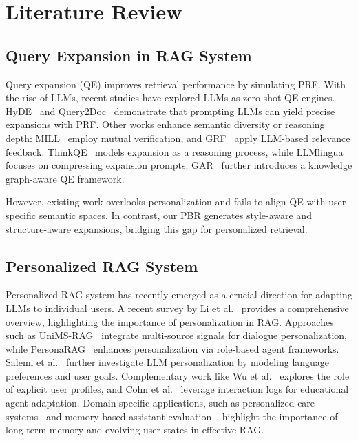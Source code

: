 \section{Literature Review}

\subsection{Query Expansion in RAG System}

Query expansion (QE) improves retrieval performance by simulating PRF. With the rise of LLMs, recent studies have explored LLMs as zero-shot QE engines. HyDE~\cite{gao2023precise} and Query2Doc~\cite{wang2023query2doc} demonstrate that prompting LLMs can yield precise expansions with PRF. Other works enhance semantic diversity or reasoning depth: MILL~\cite{jia2023mill} employ mutual verification, and GRF~\cite{mackie2023generative} apply LLM-based relevance feedback. ThinkQE~\cite{lei2025thinkqe} models expansion as a reasoning process, while LLMlingua~\cite{jiang2023llmlingua} focuses on compressing expansion prompts. GAR~\cite{xia2024knowledge} further introduces a knowledge graph-aware QE framework.

However, existing work overlooks personalization and fails to align QE with user-specific semantic spaces. In contrast, our PBR generates style-aware and structure-aware expansions, bridging this gap for personalized retrieval.

\subsection{Personalized RAG System}

Personalized RAG system has recently emerged as a crucial direction for adapting LLMs to individual users. A recent survey by Li et al.~\cite{li2025survey,li2023agent4ranking} provides a comprehensive overview, highlighting the importance of personalization in RAG. Approaches such as UniMS-RAG~\cite{wang2024unims} integrate multi-source signals for dialogue personalization, while PersonaRAG~\cite{zerhoudi2024personarag} enhances personalization via role-based agent frameworks. Salemi et al.~\cite{salemi2024lamp} further investigate LLM personalization by modeling language preferences and user goals. Complementary work like Wu et al.~\cite{wu2024understanding} explores the role of explicit user profiles, and Cohn et al.~\cite{cohn2025personalizing} leverage interaction logs for educational agent adaptation. Domain-specific applications, such as personalized care systems~\cite{yang2025improving} and memory-based assistant evaluation~\cite{wu2025longmemeval,xu2025towards,xu2025align}, highlight the importance of long-term memory and evolving user states in effective RAG.

